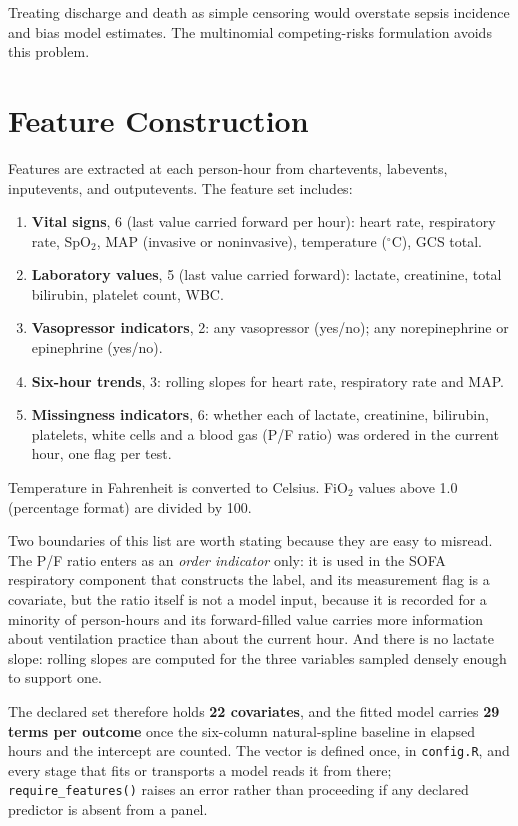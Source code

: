Treating discharge and death as simple censoring would overstate sepsis
incidence and bias model estimates. The multinomial competing-risks formulation
avoids this problem.


\section{Feature Construction}
\label{sec:features}

Features are extracted at each person-hour from chartevents, labevents,
inputevents, and outputevents. The feature set includes:

\begin{enumerate}
    \item \textbf{Vital signs}, 6 (last value carried forward per hour): heart
    rate, respiratory rate, SpO$_2$, MAP (invasive or noninvasive), temperature
    ($^\circ$C), GCS total.
    \item \textbf{Laboratory values}, 5 (last value carried forward): lactate,
    creatinine, total bilirubin, platelet count, WBC.
    \item \textbf{Vasopressor indicators}, 2: any vasopressor (yes/no); any
    norepinephrine or epinephrine (yes/no).
    \item \textbf{Six-hour trends}, 3: rolling slopes for heart rate,
    respiratory rate and MAP.
    \item \textbf{Missingness indicators}, 6: whether each of lactate,
    creatinine, bilirubin, platelets, white cells and a blood gas
    (P/F ratio) was ordered in the current hour, one flag per test.
\end{enumerate}

Temperature in Fahrenheit is converted to Celsius. FiO$_2$ values above 1.0
(percentage format) are divided by 100.

Two boundaries of this list are worth stating because they are easy to
misread. The P/F ratio enters as an \emph{order indicator} only: it is used in
the SOFA respiratory component that constructs the label, and its measurement
flag is a covariate, but the ratio itself is not a model input, because it is
recorded for a minority of person-hours and its forward-filled value carries
more information about ventilation practice than about the current hour. And
there is no lactate slope: rolling slopes are computed for the three variables
sampled densely enough to support one.

The declared set therefore holds \textbf{22 covariates}, and the fitted model
carries \textbf{29 terms per outcome} once the six-column natural-spline
baseline in elapsed hours and the intercept are counted. The vector is defined
once, in \texttt{config.R}, and every stage that fits or transports a model
reads it from there; \texttt{require\_features()} raises an error rather than
proceeding if any declared predictor is absent from a panel.


